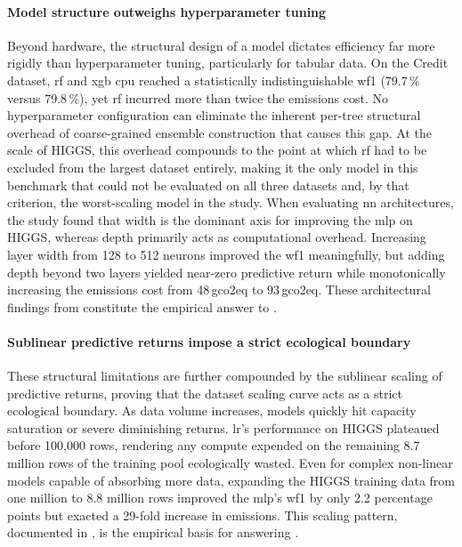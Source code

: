 \paragraph{Model structure outweighs hyperparameter tuning}
Beyond hardware, the structural design of a model dictates efficiency far more rigidly than hyperparameter tuning, particularly for tabular data. On the Credit dataset, \gls{rf} and \gls{xgb} \gls{cpu} reached a statistically indistinguishable \gls{wf1} (79.7\,\% versus 79.8\,\%), yet \gls{rf} incurred more than twice the emissions cost. No hyperparameter configuration can eliminate the inherent per-tree structural overhead of coarse-grained ensemble construction that causes this gap. At the scale of HIGGS, this overhead compounds to the point at which \gls{rf} had to be excluded from the largest dataset entirely, making it the only model in this benchmark that could not be evaluated on all three datasets and, by that criterion, the worst-scaling model in the study. When evaluating \gls{nn} architectures, the study found that width is the dominant axis for improving the \gls{mlp} on HIGGS, whereas depth primarily acts as computational overhead. Increasing layer width from 128 to 512 neurons improved the \gls{wf1} meaningfully, but adding depth beyond two layers yielded near-zero predictive return while monotonically increasing the emissions cost from 48\,\gls{gco2eq} to 93\,\gls{gco2eq}. These architectural findings from  constitute the empirical answer to .

\paragraph{Sublinear predictive returns impose a strict ecological boundary}
These structural limitations are further compounded by the sublinear scaling of predictive returns, proving that the dataset scaling curve acts as a strict ecological boundary. As data volume increases, models quickly hit capacity saturation or severe diminishing returns. \gls{lr}'s performance on HIGGS plateaued before 100{,}000 rows, rendering any compute expended on the remaining 8.7 million rows of the training pool ecologically wasted. Even for complex non-linear models capable of absorbing more data, expanding the HIGGS training data from one million to 8.8 million rows improved the \gls{mlp}'s \gls{wf1} by only 2.2 percentage points but exacted a 29-fold increase in emissions. This scaling pattern, documented in , is the empirical basis for answering .

